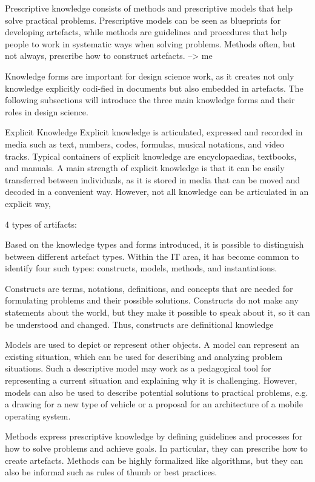 Prescriptive knowledge consists of methods and prescriptive models
that help solve practical problems. Prescriptive models can be seen
as blueprints for developing artefacts, while methods are guidelines
and procedures that help people to work in systematic ways when
solving problems. Methods often, but not always, prescribe how to
construct artefacts. --> me



Knowledge forms are important for design
science work, as it creates not only knowledge explicitly codi-fied in documents but also embedded in artefacts. The following subsections
will introduce the three main knowledge forms and their
roles in design science.  

Explicit Knowledge
Explicit knowledge is articulated, expressed and recorded in media
such as text, numbers, codes, formulas, musical notations, and video
tracks. Typical containers of explicit knowledge are encyclopaedias,
textbooks, and manuals. A main strength of explicit knowledge is
that it can be easily transferred between individuals, as it is stored in
media that can be moved and decoded in a convenient way. However,
not all knowledge can be articulated in an explicit way,



4 types of artifacts:

Based on the knowledge types and forms introduced, it is possible to
distinguish between different artefact types. Within the IT area, it
has become common to identify four such types: constructs, models,
methods, and instantiations.

Constructs are terms, notations, definitions, and concepts that are
needed for formulating problems and their possible solutions. Constructs
do not make any statements about the world, but they make
it possible to speak about it, so it can be understood and changed.
Thus, constructs are definitional knowledge

Models are used to depict or represent other objects. A model can
represent an existing situation, which can be used for describing and
analyzing problem situations. Such a descriptive model may work as a
pedagogical tool for representing a current situation and explaining
why it is challenging. However, models can also be used to describe
potential solutions to practical problems, e.g. a drawing for a new
type of vehicle or a proposal for an architecture of a mobile operating
system.

Methods express prescriptive knowledge by defining guidelines
and processes for how to solve problems and achieve goals. In particular,
they can prescribe how to create artefacts. Methods can be
highly formalized like algorithms, but they can also be informal such
as rules of thumb or best practices.

